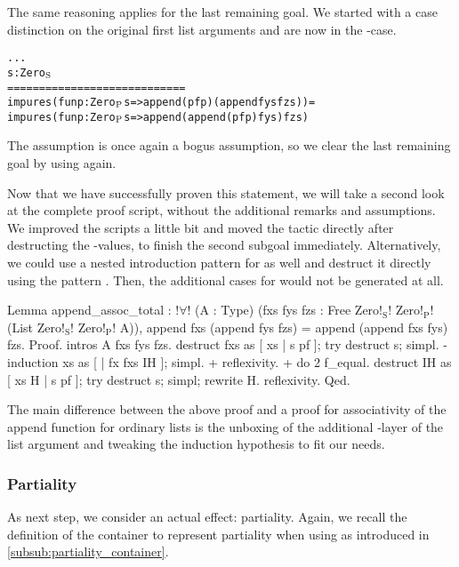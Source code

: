 The same reasoning applies for the last remaining goal.
We started with a case distinction on the original first list arguments  and are now in the \--case.

\begin{alltt}
  ...
  s : Zero\(\sb{\text{S}}\)
  ============================
  impure s (fun p : Zero\(\sb{\text{P}}\) s => append (pf p) (append fys fzs)) =
  impure s (fun p : Zero\(\sb{\text{P}}\) s => append (append (pf p) fys) fzs)
\end{alltt}

The assumption  is once again a bogus assumption, so we clear the last remaining goal by using  again.

Now that we have successfully proven this statement, we will take a second look at the complete proof script, without the additional remarks and assumptions.
We improved the scripts a little bit and moved the  tactic directly after destructing the \--values, to finish the second subgoal immediately.
Alternatively, we could use a nested introduction pattern for  as well and destruct it directly using the pattern \cinl{[]}.
Then, the additional cases for  would not be generated at all.

\begin{coqcode}
Lemma append_assoc_total :
 !$\forall$! (A : Type) (fxs fys fzs : Free Zero!$_\text{S}$! Zero!$_\text{P}$! (List Zero!$_\text{S}$! Zero!$_\text{P}$! A)),
   append fxs (append fys fzs) = append (append fxs fys) fzs.
Proof.
 intros A fxs fys fzs.
 destruct fxs as [ xs | s pf ]; try destruct s; simpl.
 - induction xs as [ | fx fxs IH ]; simpl.
   + reflexivity.
   + do 2 f_equal. destruct IH as [ xs H | s pf ]; try destruct s; simpl;
       rewrite H. reflexivity.
Qed.
\end{coqcode}

The main difference between the above proof and a proof for associativity of the append function for ordinary lists is the unboxing of the additional \--layer of the list argument and tweaking the induction hypothesis to fit our needs.

\subsubsection{Partiality}
As next step, we consider an actual effect: partiality.
Again, we recall the definition of the container to represent partiality when using  as introduced in \autoref{subsub:partiality_container}.

